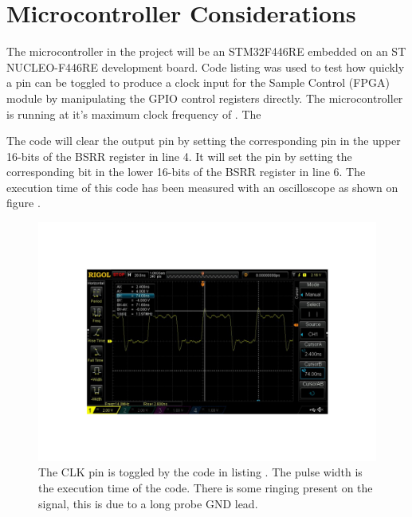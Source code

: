 \chapter{Microcontroller Considerations} \label{App:MicrocontrollerConsiderations}

The microcontroller in the project will be an STM32F446RE\cite{ST_STM32F446RE} embedded on an ST NUCLEO-F446RE\cite{ST_NUCLEOF446RE} development board. Code listing  was used to test how quickly a pin can be toggled to produce a clock input for the Sample Control (FPGA) module by manipulating the GPIO control registers directly. The microcontroller is running at it's maximum clock frequency of . The 



The code will clear the output pin by setting the corresponding pin in the upper 16-bits of the BSRR register in line 4. It will set the pin by setting the corresponding bit in the lower 16-bits of the BSRR register in line 6. The execution time of this code has been measured with an oscilloscope as shown on figure .

\begin{figure}[H]
    \centering
    \includegraphics[clip, trim=0 100 0 100, width=1\textwidth]{Appendix/Figures/IOSetResetSpeed.pdf}
    \caption{The CLK pin is toggled by the code in listing . The pulse width is the execution time of the code. There is some ringing present on the signal, this is due to a long probe GND lead.}
    \label{fig:App_A_SetResetSpeed}
\end{figure}

